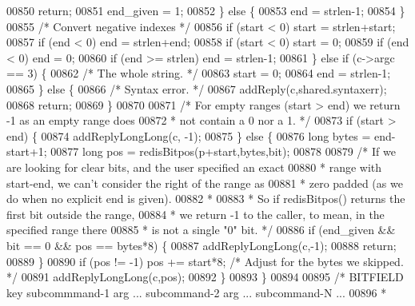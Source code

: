 \begin{DoxyCode}
{00850                 \textcolor{keywordflow}{return};
00851             end\_given = 1;
00852         \} \textcolor{keywordflow}{else} \{
00853             end = strlen-1;
00854         \}
00855         \textcolor{comment}{/* Convert negative indexes */}
00856         \textcolor{keywordflow}{if} (start < 0) start = strlen+start;
00857         \textcolor{keywordflow}{if} (end < 0) end = strlen+end;
00858         \textcolor{keywordflow}{if} (start < 0) start = 0;
00859         \textcolor{keywordflow}{if} (end < 0) end = 0;
00860         \textcolor{keywordflow}{if} (end >= strlen) end = strlen-1;
00861     \} \textcolor{keywordflow}{else} \textcolor{keywordflow}{if} (c->argc == 3) \{
00862         \textcolor{comment}{/* The whole string. */}
00863         start = 0;
00864         end = strlen-1;
00865     \} \textcolor{keywordflow}{else} \{
00866         \textcolor{comment}{/* Syntax error. */}
00867         addReply(c,shared.syntaxerr);
00868         \textcolor{keywordflow}{return};
00869     \}
00870 
00871     \textcolor{comment}{/* For empty ranges (start > end) we return -1 as an empty range does}
00872 \textcolor{comment}{     * not contain a 0 nor a 1. */}
00873     \textcolor{keywordflow}{if} (start > end) \{
00874         addReplyLongLong(c, -1);
00875     \} \textcolor{keywordflow}{else} \{
00876         \textcolor{keywordtype}{long} bytes = end-start+1;
00877         \textcolor{keywordtype}{long} pos = redisBitpos(p+start,bytes,bit);
00878 
00879         \textcolor{comment}{/* If we are looking for clear bits, and the user specified an exact}
00880 \textcolor{comment}{         * range with start-end, we can't consider the right of the range as}
00881 \textcolor{comment}{         * zero padded (as we do when no explicit end is given).}
00882 \textcolor{comment}{         *}
00883 \textcolor{comment}{         * So if redisBitpos() returns the first bit outside the range,}
00884 \textcolor{comment}{         * we return -1 to the caller, to mean, in the specified range there}
00885 \textcolor{comment}{         * is not a single "0" bit. */}
00886         \textcolor{keywordflow}{if} (end\_given && bit == 0 && pos == bytes*8) \{
00887             addReplyLongLong(c,-1);
00888             \textcolor{keywordflow}{return};
00889         \}
00890         \textcolor{keywordflow}{if} (pos != -1) pos += start*8; \textcolor{comment}{/* Adjust for the bytes we skipped. */}
00891         addReplyLongLong(c,pos);
00892     \}
00893 \}
00894 
00895 \textcolor{comment}{/* BITFIELD key subcommmand-1 arg ... subcommand-2 arg ... subcommand-N ...}
00896 \textcolor{comment}{ *}
}
\end{DoxyCode}
